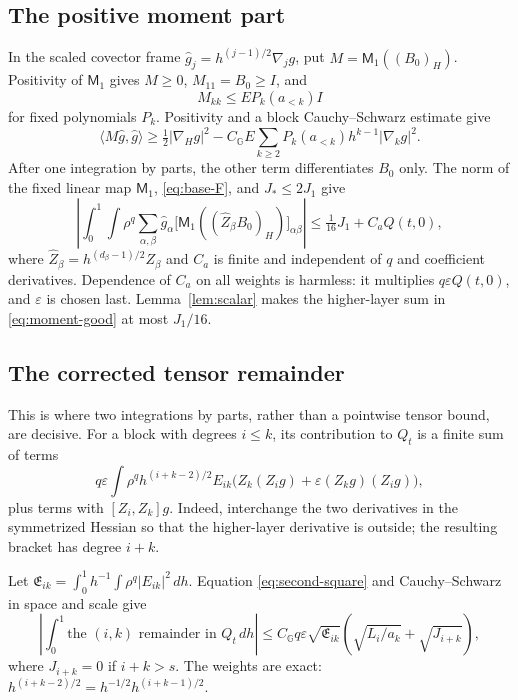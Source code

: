 \documentclass[11pt,a4paper]{amsart}
\numberwithin{equation}{section}
\theoremstyle{remark}\newtheorem{remark}[theorem]{Remark}
\newcommand{\G}{\mathbb G}
\newcommand{\eps}{\varepsilon}
\newcommand{\Mom}{\mathsf M}
\newcommand{\ip}[2]{\langle #1,#2\rangle}
\newcommand{\dd}{\,d}
\begin{document}
\subsection{The positive moment part}
In the scaled covector frame $\widehat g_j=h^{(j-1)/2}\nabla_jg$, put
$M=\Mom_1((B_0)_H)$. Positivity of $\Mom_1$ gives $M\ge0$,
$M_{11}=B_0\ge I$, and
\[
 M_{kk}\le E P_k(a_{<k})I
\]
for fixed polynomials $P_k$. Positivity and a block Cauchy--Schwarz estimate give
\begin{equation}\label{eq:moment-good}
 \ip{M\widehat g}{\widehat g}
 \ge\tfrac12|\nabla_Hg|^2
       -C_\G E\sum_{k\ge2}P_k(a_{<k})h^{k-1}|\nabla_kg|^2.
\end{equation}
After one integration by parts, the other term differentiates $B_0$ only.
The norm of the fixed linear map $\Mom_1$, \eqref{eq:base-F}, and
$J_*\le2J_1$ give
\begin{equation}\label{eq:base-derivative-error}
 \left|\int_0^1\!\int\rho^q
 \sum_{\alpha,\beta}\widehat g_\alpha
 \big[\Mom_1((\widehat Z_\beta B_0)_H)\big]_{\alpha\beta}\right|
 \le\tfrac1{16}J_1+C_aQ(t,0),
\end{equation}
where $\widehat Z_\beta=h^{(d_\beta-1)/2}Z_\beta$ and $C_a$ is finite and
independent of $q$ and coefficient derivatives. Dependence of $C_a$ on all
weights is harmless: it multiplies $q\eps Q(t,0)$, and $\eps$ is chosen last.
Lemma~\ref{lem:scalar} makes the higher-layer sum in
\eqref{eq:moment-good} at most $J_1/16$.

\subsection{The corrected tensor remainder}
This is where two integrations by parts, rather than a pointwise tensor bound,
are decisive. For a block with degrees $i\le k$, its contribution to $Q_t$ is a
finite sum of terms
\begin{equation}\label{eq:two-ibp}
 q\eps\int\rho^q h^{(i+k-2)/2}E_{ik}
          \big(Z_k(Z_ig)+\eps(Z_kg)(Z_ig)\big),
\end{equation}
plus terms with $[Z_i,Z_k]g$. Indeed, interchange the two derivatives in the
symmetrized Hessian so that the higher-layer derivative is outside; the
resulting bracket has degree $i+k$.

Let $\mathfrak E_{ik}=\int_0^1h^{-1}\int\rho^q|E_{ik}|^2\dd h$.
Equation \eqref{eq:second-square} and Cauchy--Schwarz in space and scale give
\begin{equation}\label{eq:flux-estimate}
 \left|\int_0^1\text{the $(i,k)$ remainder in $Q_t$}\dd h\right|
 \le C_\G q\eps\sqrt{\mathfrak E_{ik}}
       \left(\sqrt{L_i/a_k}+\sqrt{J_{i+k}}\right),
\end{equation}
where $J_{i+k}=0$ if $i+k>s$. The weights are exact:
$h^{(i+k-2)/2}=h^{-1/2}h^{(i+k-1)/2}$.
\end{document}
